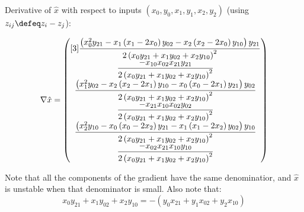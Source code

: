 Derivative of $\hat{x}$ with respect to inputs
$(x_0,y_0,x_1,y_1,x_2,y_2)$
(using $z_{ij} \defeq z_i - z_j$):

\begin{equation}
\nabla \hat{x} =
\begin{pmatrix}[3]
\dfrac{
\left(
x_0^2 y_{21}
-
x_1 \left( x_1 - 2 x_0 \right) y_{02}
- 
x_2 \left( x_2 - 2 x_0 \right) y_{10}
\right)
y_{21}
}{ %
2 \left( x_0 y_{21} + x_1 y_{02} + x_2 y_{10} \right)^{2}
} 
\\ %
\dfrac{
- x_{10} x_{02} x_{21} y_{21}
}{
2 \left( x_0 y_{21} + x_1 y_{02} + x_2 y_{10} \right)^{2}
} 
\\  %
\dfrac{
\left(
x_1^2 y_{02}
-
x_2 \left( x_2 - 2 x_1 \right) y_{10}
- 
x_0 \left( x_0 - 2 x_1 \right) y_{21}
\right)
y_{02}
}{ %
2 \left( x_0 y_{21} + x_1 y_{02} + x_2 y_{10} \right)^{2}
}
\\ %
\dfrac{
- x_{21} x_{10} x_{02} y_{02}
}{ %
2 \left( x_0 y_{21} + x_1 y_{02} + x_2 y_{10} \right)^{2}
} 
\\ %
\dfrac{
\left(
x_2^2 y_{10}
-
x_0 \left( x_0 - 2 x_2 \right) y_{21}
- 
x_1 \left( x_1 - 2 x_2 \right) y_{02}
\right)
y_{10}
}{ %
2 \left( x_0 y_{21} + x_1 y_{02} + x_2 y_{10} \right)^{2}
}
\\ %
\dfrac{
- x_{02} x_{21} x_{10} y_{10}
}{ %
2 \left( x_0 y_{21} + x_1 y_{02} + x_2 y_{10} \right)^{2}
}
\end{pmatrix}
\end{equation}

Note that all the components of the gradient have the same 
denominatior, and
$\hat{x}$ is unstable when that denominator is small.
Also note that:
\begin{equation}
x_0 y_{21} + x_1 y_{02} + x_2 y_{10}
=
- \left(
y_0 x_{21} + y_1 x_{02} + y_2 x_{10}
\right)
\end{equation}

\label{sec:monomial-yyd}


